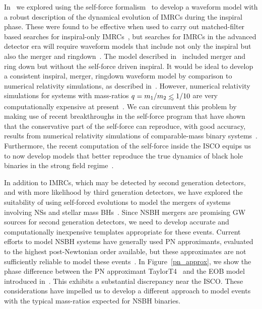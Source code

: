 \documentclass[aps,prd,showpacs,amssymb,floatfix,nofootinbib,superscriptaddress]{revtex4-1}%
\def\lesssim{\mathrel{\hbox{\rlap{\hbox{\lower4pt\hbox{$\sim$}}}\hbox{$<$}}}}
\begin{document}
In~\cite{Huerta:2009,Huerta:2010,Huerta:EHE,Huerta:2012} we explored using the self-force formalism~\cite{SFB,LRP} to develop a waveform model with a robust description of the dynamical evolution of IMRCs during the inspiral phase. These were found to be effective when used to carry out matched-filter based searches for inspiral-only IMRCs~\cite{Smith:2013}, but searches for IMRCs in the advanced detector era will require waveform models that include not only the inspiral but also the merger and ringdown~\cite{Smith:2013}. The model described in~\cite{Huerta:2011a} included merger and ring down but without the self-force driven inspiral. It would be ideal to develop a consistent inspiral, merger, ringdown waveform model by comparison to numerical relativity simulations, as described in~\cite{buho,Damour:2013}. However, numerical relativity simulations for systems with mass-ratios \(q=m_1/m_2 \lesssim 1/10\) are very computationally expensive at present~\cite{Mroue:2013}. We can circumvent this problem by making use of recent breakthroughs in the self-force program that have shown that the conservative part of the self-force can reproduce, with good accuracy, results from numerical relativity simulations of comparable-mass binary systems~\cite{LeTiec:2012}.   Furthermore, the recent computation of the self-force inside the ISCO equips us to now develop models that better reproduce the true dynamics of black hole binaries in the strong field regime~\cite{Akcay:2012}.  

In addition to IMRCs, which may be detected by second generation detectors, and with more likelihood by third generation detectors, we have explored the suitability of using self-forced evolutions to model the mergers of systems involving NSs and stellar mass BHs~\cite{LVCT}. Since NSBH mergers are promising GW sources for second generation detectors, we need to develop accurate and computationally inexpensive templates appropriate for these events. Current efforts to model NSBH systems have generally used PN approximants, evaluated to the highest post-Newtonian order available, but these approximates are not sufficiently reliable to model these events~\cite{pnbuo,Nitz:2013mxa}. In Figure~\ref{pn_approx}, we show the phase difference between the PN approximant TaylorT4~\cite{TaylorT4Origin} and the EOB model introduced in~\cite{buho, Damour:2013}. This exhibits a substantial discrepancy near the ISCO. These considerations have impelled us to develop a different approach to model events with the typical mass-ratios expected for NSBH binaries. 
\end{document}
